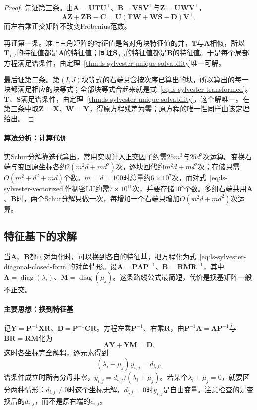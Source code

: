 \begin{proof}
先证第三条。由$\bm A=\bm U\bm T\bm U^\top$、$\bm B=\bm V\bm S\bm V^\top$与$\bm Z=\bm U\bm W\bm V^\top$，
\[
 \bm A\bm Z+\bm Z\bm B-\bm C=\bm U(\bm T\bm W+\bm W\bm S-\bm D)\bm V^\top,
\]
而左右乘正交矩阵不改变Frobenius范数。

再证第一条。准上三角矩阵的特征值是各对角块特征值的并，$\bm T$与$\bm A$相似，所以$\bm T_{I,I}$的特征值都是$\bm A$的特征值；同理$\bm S_{J,J}$的特征值都是$\bm B$的特征值。于是每个局部方程满足谱条件，由定理~\ref{thm:ls-sylvester-unique-solvability}唯一可解。

最后证第二条。第$(I,J)$块等式的右端只含按次序已算出的块，所以算出的每一块都满足相应的块等式；全部块等式合起来就是式~\eqref{eq:ls-sylvester-transformed}。$\bm T$、$\bm S$满足谱条件，由定理~\ref{thm:ls-sylvester-unique-solvability}，这个解唯一。在第三条中取$\bm Z=\bm X$、$\bm W=\bm Y$，得原方程残差为零；原方程的唯一性同样由该定理给出。
\end{proof}

\paragraph{算法分析：计算代价}
实Schur分解靠迭代算出，常用实现计入正交因子约需$25m^3$与$25d^3$次运算。变换右端与变回原坐标各约$2(m^2d+md^2)$次，逐块回代约$m^2d+md^2$次；存储只需$O(m^2+d^2+md)$个数。$m=d=100$时总量约$6\times10^7$次，而对式~\eqref{eq:ls-sylvester-vectorized}作稠密LU约需$7\times10^{11}$次，并要存储$10^8$个数。多组右端共用$\bm A$、$\bm B$时，两个Schur分解只做一次，每增加一个右端只增加$O(m^2d+md^2)$次运算。

\subsection{特征基下的求解}
\label{sec:ls-sylvester-diagonalizable}

当$\bm A$、$\bm B$都可对角化时，可以换到各自的特征基，把方程化为式~\eqref{eq:ls-sylvester-diagonal-closed-form}的对角情形。设$\bm A=\bm P\bm\Lambda\bm P^{-1}$、$\bm B=\bm R\bm M\bm R^{-1}$，其中$\bm\Lambda=\operatorname{diag}(\lambda_i)$、$\bm M=\operatorname{diag}(\mu_j)$。这条路线公式最简短，代价是换基矩阵一般不正交。

\paragraph{主要思想：换到特征基}
记$\bm Y=\bm P^{-1}\bm X\bm R$、$\bm D=\bm P^{-1}\bm C\bm R$。方程左乘$\bm P^{-1}$、右乘$\bm R$，由$\bm P^{-1}\bm A=\bm\Lambda\bm P^{-1}$与$\bm B\bm R=\bm R\bm M$化为
\[
 \bm\Lambda\bm Y+\bm Y\bm M=\bm D .
\]
这时各坐标完全解耦，逐元素得到
\[
 (\lambda_i+\mu_j)\,y_{i,j}=d_{i,j}.
\]
谱条件成立时所有分母非零，$y_{i,j}=d_{i,j}/(\lambda_i+\mu_j)$。若某个$\lambda_i+\mu_j=0$，就要区分两种情形：$d_{i,j}\neq0$时这个坐标无解，$d_{i,j}=0$时$y_{i,j}$是自由变量。注意检查的是变换后的$d_{i,j}$，而不是原右端的$c_{i,j}$。

